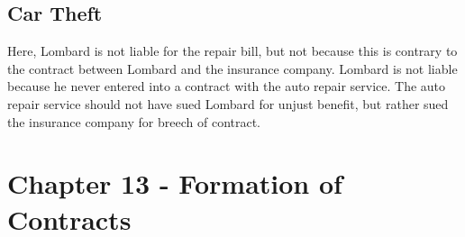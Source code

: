\documentclass[11pt,a4paper]{article}
\begin{document}
    \subsection{Car Theft}
      Here, Lombard is not liable for the repair bill, but not because this is contrary to the contract between Lombard and the insurance company. Lombard is not liable because he never entered into a contract with the auto repair service. The auto repair service should not have sued Lombard for unjust benefit, but rather sued the insurance company for breech of contract. 
   \section{Chapter 13 - Formation of Contracts}
\end{document}
